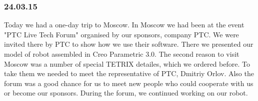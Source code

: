 \subsubsection{24.03.15}

Today we had a one-day trip to Moscow. In Moscow we had been at the event "PTC Live Tech Forum" organised by our sponsors, company PTC. We were invited there by PTC to show how we use their software. There we presented our model of robot assembled in Creo Parametric 3.0.\newline
The second reason to visit Moscow was a number of special TETRIX detailes, which we ordered before. To take them we needed to meet the representative of PTC, Dmitriy Orlov.\newline
Also the forum was a good chance for us to meet new people who could cooperate with us or become our sponsors.\newline
During the forum, we continued working on our robot.

